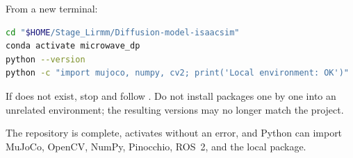 From a new terminal:

\begin{lstlisting}[language=bash]
cd "$HOME/Stage_Lirmm/Diffusion-model-isaacsim"
conda activate microwave_dp
python --version
python -c "import mujoco, numpy, cv2; print('Local environment: OK')"
\end{lstlisting}

If  does not exist, stop and follow
. Do not install packages one by one into an unrelated
environment; the resulting versions may no longer match the project.

\begin{checkpointbox}
The repository is complete,  activates without an
error, and Python can import MuJoCo, OpenCV, NumPy, Pinocchio, ROS~2, and the
local  package.
\end{checkpointbox}
